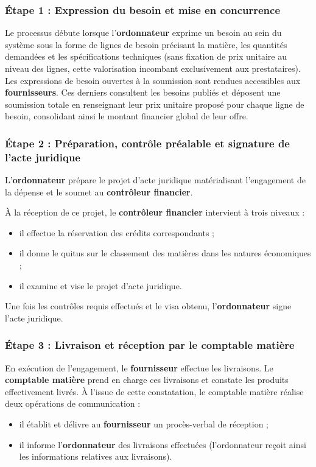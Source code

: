 \subsubsection{Étape 1 : Expression du besoin et mise en concurrence}
Le processus débute lorsque l'\textbf{ordonnateur} exprime un besoin au sein du système sous la forme de lignes de besoin précisant la matière, les quantités demandées et les spécifications techniques (sans fixation de prix unitaire au niveau des lignes, cette valorisation incombant exclusivement aux prestataires). Les expressions de besoin ouvertes à la soumission sont rendues accessibles aux \textbf{fournisseurs}. Ces derniers consultent les besoins publiés et déposent une soumission totale en renseignant leur prix unitaire proposé pour chaque ligne de besoin, consolidant ainsi le montant financier global de leur offre.

\subsubsection{Étape 2 : Préparation, contrôle préalable et signature de l'acte juridique}
L'\textbf{ordonnateur} prépare le projet d'acte juridique matérialisant l'engagement de la dépense et le soumet au \textbf{contrôleur financier}.

À la réception de ce projet, le \textbf{contrôleur financier} intervient à trois niveaux :
\begin{itemize}
  \item il effectue la réservation des crédits correspondants ;
  \item il donne le quitus sur le classement des matières dans les natures économiques ;
  \item il examine et vise le projet d'acte juridique.
\end{itemize}
Une fois les contrôles requis effectués et le visa obtenu, l'\textbf{ordonnateur} signe l'acte juridique.

\subsubsection{Étape 3 : Livraison et réception par le comptable matière}
En exécution de l'engagement, le \textbf{fournisseur} effectue les livraisons. Le \textbf{comptable matière} prend en charge ces livraisons et constate les produits effectivement livrés. À l'issue de cette constatation, le comptable matière réalise deux opérations de communication :
\begin{itemize}
  \item il établit et délivre au \textbf{fournisseur} un procès-verbal de réception ;
  \item il informe l'\textbf{ordonnateur} des livraisons effectuées (l'ordonnateur reçoit ainsi les informations relatives aux livraisons).
\end{itemize}

